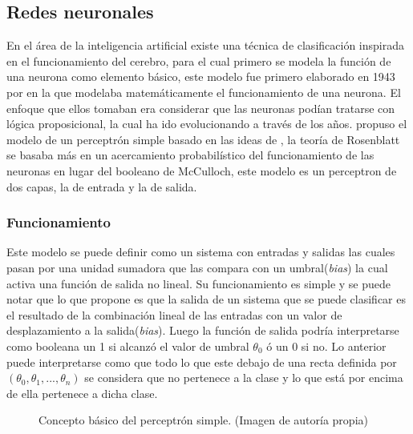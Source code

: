 \subsection{Redes neuronales}

\par En el área de la inteligencia artificial existe una técnica de clasificación inspirada en el funcionamiento del cerebro, para el cual primero se modela la función de una neurona como elemento básico, este modelo fue primero elaborado en 1943 por \cite{mcculloch1943logical} en la que modelaba matemáticamente el funcionamiento de una neurona. El enfoque que ellos tomaban era considerar que las neuronas podían tratarse con lógica proposicional, la cual ha ido evolucionando a través de los años.  \cite{rosenblatt1958perceptron} propuso el modelo de un perceptrón simple basado en las ideas de \cite{mcculloch1943logical}, la teoría de Rosenblatt se basaba más en un acercamiento probabilístico del funcionamiento de las neuronas en lugar del booleano de McCulloch, este modelo es un perceptron de dos capas, la de entrada y la de salida.

\subsubsection{Funcionamiento}

\par Este modelo se puede definir como un sistema con entradas y salidas las cuales pasan por una unidad sumadora que las compara con un umbral(\textit{bias}) la cual activa una función de salida no lineal. Su funcionamiento es simple y se puede notar que lo que propone es que la salida de un sistema que se puede clasificar es el resultado de la combinación lineal de las entradas con un valor de desplazamiento a la salida(\textit{bias}). Luego la función de salida podría interpretarse como booleana un 1 si alcanzó el valor de umbral $\theta_{0}$ ó un 0 si no. Lo anterior puede interpretarse como que todo lo que este debajo de una recta definida por $(\theta_0,\theta_1,...,\theta_n)$ se considera que no pertenece a la clase y lo que está por encima de ella pertenece a dicha clase.
\begin{figure}[H]
	\centering
	
	\caption{Concepto básico del perceptrón simple. (Imagen de autoría propia)}
	\label{fig:perceptron}
\end{figure}

